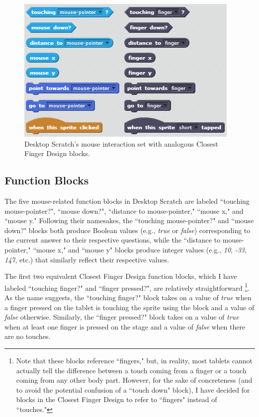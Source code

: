 \begin{figure}
\centering
\includegraphics{images/Closest_Finger_Design_Block_Set.PNG}
\caption[The Closest Finger Design Interaction Set]{Desktop Scratch's mouse interaction set with analogous Closest Finger Design blocks.}
\label{Closest_Finger_Design_Block_Set}
\end{figure}

\subsection{Function Blocks}
The five mouse-related function blocks in Desktop Scratch are labeled ``touching mouse-pointer?", ``mouse down?", ``distance to mouse-pointer," ``mouse x," and ``mouse y." Following their namesakes, the ``touching mouse-pointer?" and ``mouse down?" blocks both produce Boolean values (e.g., \emph{true} or \emph{false}) corresponding to the current answer to their respective questions, while the ``distance to mouse-pointer," ``mouse x," and ``mouse y" blocks produce integer values (e.g., \emph{10}, \emph{-33}, \emph{147}, etc.) that similarly reflect their respective values. 

The first two equivalent Closest Finger Design function blocks, which I have labeled ``touching finger?" and ``finger pressed?", are relatively straightforward
\footnote{Note that these blocks reference ``fingers," but, in reality, most tablets cannot actually tell the difference between a touch coming from a finger or a touch coming from any other body part. However, for the sake of concreteness (and to avoid the potential confusion of a ``touch down" block), I have decided for blocks in the Closest Finger Design to refer to ``fingers" instead of ``touches."}.
As the name suggests, the ``touching finger?" block takes on a value of \emph{true} when a finger pressed on the tablet is touching the sprite using the block and a value of \emph{false} otherwise. Similarly, the ``finger pressed?" block takes on a value of \emph{true} when at least one finger is pressed on the stage and a value of \emph{false} when there are no touches.

